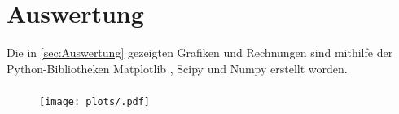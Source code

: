 \section{Auswertung}
\label{sec:Auswertung}
Die in \autoref{sec:Auswertung} gezeigten Grafiken und Rechnungen sind mithilfe der Python-Bibliotheken Matplotlib \cite{matplotlib}, Scipy \cite{scipy} und Numpy \cite{numpy}
erstellt worden.

\subsubsection{}
\begin{table}[H]
  \centering
  \caption{}
  \label{tab:}
\end{table}
\begin{figure}[H]
  \texttt{[image: plots/.pdf]}
  \caption{}
  \label{fig:}
\end{figure}